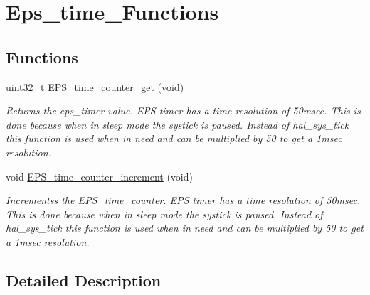 \hypertarget{group__eps__time___functions}{\section{Eps\-\_\-time\-\_\-\-Functions}
\label{group__eps__time___functions}
}
\subsection*{Functions}
\begin{DoxyCompactItemize}
\item 
uint32\-\_\-t \hyperlink{group__eps__time___functions_gafc4bbe218c73c1b84d1fd256309e6cf2}{E\-P\-S\-\_\-time\-\_\-counter\-\_\-get} (void)
\begin{DoxyCompactList}\small\item\em Returns the eps\-\_\-timer value. E\-P\-S timer has a time resolution of 50msec. This is done because when in sleep mode the systick is paused. Instead of hal\-\_\-sys\-\_\-tick this function is used when in need and can be multiplied by 50 to get a 1msec resolution. \end{DoxyCompactList}\item 
void \hyperlink{group__eps__time___functions_ga06794a87db28fcff055b67f7485f3e67}{E\-P\-S\-\_\-time\-\_\-counter\-\_\-increment} (void)
\begin{DoxyCompactList}\small\item\em Incrementss the E\-P\-S\-\_\-time\-\_\-counter. E\-P\-S timer has a time resolution of 50msec. This is done because when in sleep mode the systick is paused. Instead of hal\-\_\-sys\-\_\-tick this function is used when in need and can be multiplied by 50 to get a 1msec resolution. \end{DoxyCompactList}\end{DoxyCompactItemize}


\subsection{Detailed Description}


